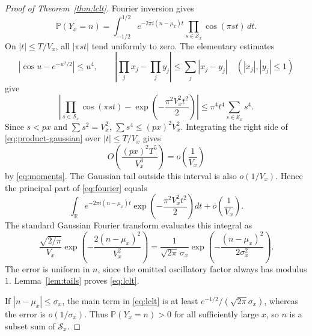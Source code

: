 \documentclass[10pt,reqno]{amsart}
\newcommand{\R}{\mathbb R}
\newcommand{\Sx}{\mathcal S_x}
\newcommand{\Prob}{\mathbb P}
\begin{document}
\begin{proof}[Proof of Theorem~\ref{thm:lclt}]
Fourier inversion gives
\begin{equation}\label{eq:fourier}
 \Prob(Y_x=n)=\int_{-1/2}^{1/2}
 e^{-2\pi i(n-\mu_x)t}
 \prod_{s\in\Sx}\cos(\pi st)\,dt.
\end{equation}
On $|t|\le T/V_x$, all $|\pi st|$ tend uniformly to zero.  The elementary
estimates
\[
 |\cos u-e^{-u^2/2}|\le u^4,
 \qquad
 \left|\prod_j x_j-\prod_j y_j\right|
 \le\sum_j|x_j-y_j|
 \quad (|x_j|,|y_j|\le1)
\]
give
\begin{equation}\label{eq:product-gaussian}
 \left|\prod_{s\in\Sx}\cos(\pi st)
 -\exp\!\left(-\frac{\pi^2V_x^2t^2}{2}\right)\right|
 \le \pi^4t^4\sum_{s\in\Sx}s^4.
\end{equation}
Since $s<px$ and $\sum s^2=V_x^2$,
$\sum s^4\le (px)^2V_x^2$.  Integrating the right side of
\eqref{eq:product-gaussian} over $|t|\le T/V_x$ gives
\[
 O\!\left(\frac{(px)^2T^5}{V_x^3}\right)=o\!\left(\frac1{V_x}\right)
\]
by \eqref{eq:moments}.  The Gaussian tail outside this interval is also
$o(1/V_x)$.  Hence the principal part of \eqref{eq:fourier} equals
\[
 \int_{\R}e^{-2\pi i(n-\mu_x)t}
 \exp\!\left(-\frac{\pi^2V_x^2t^2}{2}\right)dt
 +o\!\left(\frac1{V_x}\right).
\]
The standard Gaussian Fourier transform evaluates this integral as
\[
 \frac{\sqrt{2/\pi}}{V_x}
 \exp\!\left(-\frac{2(n-\mu_x)^2}{V_x^2}\right)
 =\frac1{\sqrt{2\pi}\,\sigma_x}
 \exp\!\left(-\frac{(n-\mu_x)^2}{2\sigma_x^2}\right).
\]
The error is uniform in $n$, since the omitted oscillatory factor always has
modulus $1$.  Lemma~\ref{lem:tails} proves \eqref{eq:lclt}.

If $|n-\mu_x|\le\sigma_x$, the main term in \eqref{eq:lclt} is at least
$e^{-1/2}/(\sqrt{2\pi}\sigma_x)$, whereas the error is
$o(1/\sigma_x)$.  Thus $\Prob(Y_x=n)>0$ for all sufficiently large $x$, so
$n$ is a subset sum of $\Sx$.
\end{proof}
\end{document}
